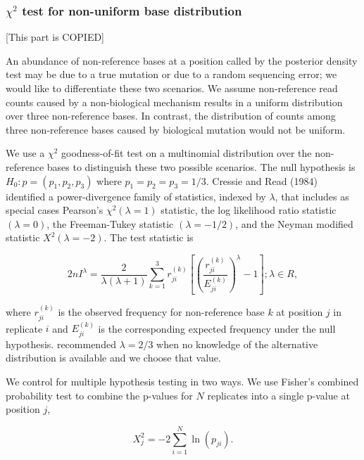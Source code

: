 \documentclass[11pt,reqno]{amsart}
\begin{document}
\subsubsection{$\chi^2$ test for non-uniform base distribution}
[This part is COPIED]

An abundance of non-reference bases at a position called by the posterior density test may be due to a true mutation or due to a random sequencing error;
we would like to differentiate these two scenarios. We assume non-reference read counts caused by a non-biological mechanism results in a uniform distribution over three non-reference bases.
In contrast, the distribution of counts among three non-reference bases caused by biological mutation would not be uniform.

We use a $\chi^2$ goodness-of-fit test on a multinomial distribution over the non-reference bases to distinguish these two possible scenarios.
The null hypothesis is $H_0: p = (p_1, p_2, p_3)$ where $p_1=p_2=p_3=1/3$.
Cressie and Read (1984) identified a power-divergence family of statistics, indexed by $\lambda$,
that includes as special cases Pearson's $\chi^2 (\lambda = 1)$ statistic, the log likelihood ratio statistic $(\lambda = 0)$, the Freeman-Tukey statistic $(\lambda = -1/2)$, and the Neyman modified statistic $X^2 (\lambda = -2)$.
The test statistic is

\begin{equation}
 2nI^\lambda = \frac{2}{\lambda(\lambda+1)}\sum_{k=1}^3 r_{ji}^{(k)} \left[\left(\frac{r_{ji}^{(k)}}{E_{ji}^{(k)}}\right)^\lambda-1\right];\lambda \in R,
\end{equation}

where $r_{ji}^{(k)}$ is the observed frequency for non-reference base $k$ at position $j$ in replicate $i$ and $E_{ji}^{(k)}$ is the corresponding expected frequency under the null hypothesis.
 \citet{cressie1984multinomial} recommended $\lambda = 2/3$ when no knowledge of the alternative distribution is available and we choose that value.

We control for multiple hypothesis testing in two ways. We use Fisher's combined probability test \citep{fisher1970statistical} to combine the p-values for $N$ replicates into a single p-value at position $j$,

\begin{equation}\label{eqn:fisher_combined}
	X_j^2 = -2 \sum_{i=1}^N \ln(p_{ji}).
\end{equation}
\end{document}
